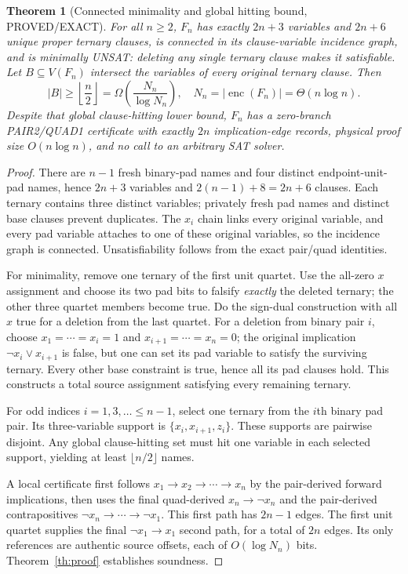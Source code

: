 \documentclass[11pt]{article}
\newtheorem{theorem}{Theorem}
\begin{document}
\begin{theorem}[Connected minimality and global hitting bound, PROVED/EXACT]\label{th:family}
For all $n\ge2$, $F_n$ has exactly $2n+3$ variables and $2n+6$ unique proper ternary clauses, is connected in its clause-variable incidence graph, and is minimally UNSAT: deleting \emph{any single ternary clause} makes it satisfiable. Let $B\subseteq V(F_n)$ intersect the variables of every original ternary clause. Then
\[
 |B|\ge\left\lfloor\frac n2\right\rfloor
       =\Omega\!\left(\frac{N_n}{\log N_n}\right),
 \quad N_n=|\operatorname{enc}(F_n)|=\Theta(n\log n).
\]
Despite that global clause-hitting lower bound, $F_n$ has a zero-branch PAIR2/QUAD1 certificate with \emph{exactly $2n$ implication-edge records}, physical proof size $O(n\log n)$, and no call to an arbitrary SAT solver.
\end{theorem}
\begin{proof}
There are $n-1$ fresh binary-pad names and four distinct endpoint-unit-pad names, hence $2n+3$ variables and $2(n-1)+8=2n+6$ clauses. Each ternary contains three distinct variables; privately fresh pad names and distinct base clauses prevent duplicates. The $x_i$ chain links every original variable, and every pad variable attaches to one of these original variables, so the incidence graph is connected. Unsatisfiability follows from the exact pair/quad identities.

For minimality, remove one ternary of the first unit quartet. Use the all-zero $x$ assignment and choose its two pad bits to falsify \emph{exactly} the deleted ternary; the other three quartet members become true. Do the sign-dual construction with all $x$ true for a deletion from the last quartet. For a deletion from binary pair $i$, choose $x_1=\cdots=x_i=1$ and $x_{i+1}=\cdots=x_n=0$; the original implication $\neg x_i\vee x_{i+1}$ is false, but one can set its pad variable to satisfy the surviving ternary. Every other base constraint is true, hence all its pad clauses hold. This constructs a total source assignment satisfying every remaining ternary.

For odd indices $i=1,3,\ldots\le n-1$, select one ternary from the $i$th binary pad pair. Its three-variable support is $\{x_i,x_{i+1},z_i\}$. These supports are pairwise disjoint. Any global clause-hitting set must hit one variable in each selected support, yielding at least $\lfloor n/2\rfloor$ names.

A local certificate first follows $x_1\to x_2\to\cdots\to x_n$ by the pair-derived forward implications, then uses the final quad-derived $x_n\to\neg x_n$ and the pair-derived contrapositives $\neg x_n\to\cdots\to\neg x_1$. This first path has $2n-1$ edges. The first unit quartet supplies the final $\neg x_1\to x_1$ second path, for a total of $2n$ edges. Its only references are authentic source offsets, each of $O(\log N_n)$ bits. Theorem~\ref{th:proof} establishes soundness.\end{proof}
\end{document}
